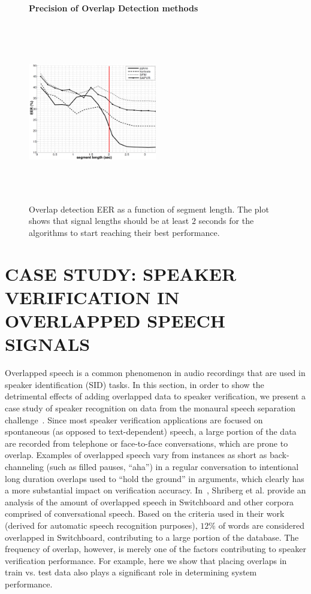 {\begin{figure}[h!]
	\centering
	\hspace{-1mm}
	\textbf{Precision of Overlap Detection methods}\par\medskip
	\includegraphics[height = 3.1in, width=0.5\textwidth]{figures/eer_vs_time}
	\vspace{-1mm}
	\caption{Overlap detection EER as a function of segment length. The plot shows that signal lengths should be at least $2$ seconds for the algorithms to start reaching their best performance.}
	\vspace{0mm}
	\label{fig:ovl_det_precision}
\end{figure}


\section{CASE STUDY: SPEAKER VERIFICATION IN OVERLAPPED SPEECH SIGNALS}
\label{sec:sid_in_cochannel}
Overlapped speech is a common phenomenon in audio recordings that are used in speaker identification (SID) tasks. In this section, in order to show the detrimental effects of adding overlapped data to speaker verification, we present a case study of speaker recognition on data from the monaural speech separation challenge~\cite{cooke20101}. Since most speaker verification applications are focused on spontaneous (as opposed to text-dependent) speech, a large portion of the data are recorded from telephone or face-to-face conversations, which are prone to overlap. Examples of overlapped speech vary from instances as short as back-channeling (such as filled pauses, ``aha'') in a regular conversation to intentional long duration overlaps used to “hold the ground” in arguments, which clearly has a more substantial impact on verification accuracy. In~\cite{Shriberg01observationson}, Shriberg et al. provide an analysis of the amount of overlapped speech in Switchboard and other corpora comprised of conversational speech. Based on the criteria used in their work (derived for automatic speech recognition purposes), $12\%$ of words are considered overlapped in Switchboard, contributing to a large portion of the database. The frequency of overlap, however, is merely one of the factors contributing to speaker verification performance. For example, here we show that placing overlaps in train vs. test data also plays a significant role in determining system performance. 

}
